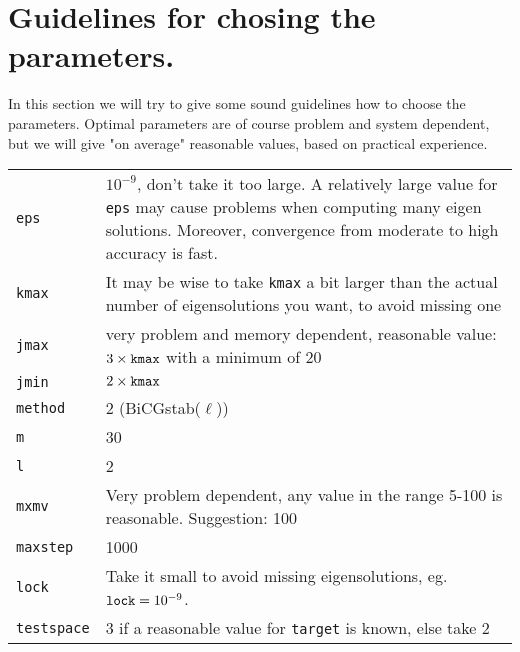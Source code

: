 \documentclass[12pt,a4paper]{article}
\begin{document}
\section{Guidelines for chosing the parameters.}
In this section we will try to give some sound guidelines how to choose the
parameters. Optimal parameters are of course problem and system dependent, but
we will give "on average" reasonable values, based on practical experience.

\begin{tabular}{lp{10cm}}
{\tt eps}& $10^{-9}$, don't take it too large. A relatively large value for
{\tt eps} may
cause problems when computing many eigen solutions. Moreover, 
convergence from moderate to high accuracy is fast.\\
{\tt kmax}& It may be wise to take {\tt kmax} a bit larger than the actual 
number of eigensolutions you want, to avoid missing one\\
{\tt jmax}& very problem and memory dependent, reasonable value: $3 \times {\tt kmax}$ with a minimum of 20\\
{\tt jmin}& $2 \times {\tt kmax}$\\
{\tt method}& 2 (BiCGstab($\ell$))\\
{\tt m}& 30\\
{\tt l}& 2\\
{\tt mxmv}& Very problem dependent, any value in the range 5-100 is reasonable.
Suggestion: 100\\
{\tt maxstep}& 1000\\
{\tt lock}& Take it small to avoid missing eigensolutions, eg. ${\tt lock} = 10^{-9}$.\\
{\tt testspace}& 3 if a reasonable value for {\tt target} is known, else take 2
\end{tabular}
\end{document}
